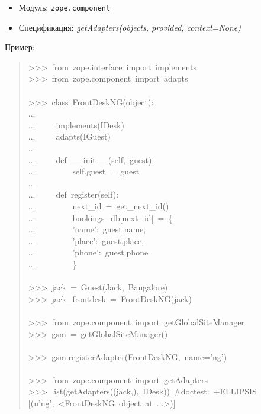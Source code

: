 \documentclass[14pt,a4paper,openany,twoside,final]{extbook}
\providecommand*{\DUroletitlereference}[1]{\textsl{#1}}
\begin{document}
\begin{itemize}

\item Модуль: \texttt{zope.component}

\item Спецификация: \DUroletitlereference{getAdapters(objects, provided, context=None)}

\end{itemize}

Пример:

\begin{quote}{\ttfamily \raggedright \noindent
>{}>{}>~from~zope.interface~import~implements\\
>{}>{}>~from~zope.component~import~adapts\\
~\\
>{}>{}>~class~FrontDeskNG(object):\\
...\\
...~~~~~implements(IDesk)\\
...~~~~~adapts(IGuest)\\
...\\
...~~~~~def~\_\_init\_\_(self,~guest):\\
...~~~~~~~~~self.guest~=~guest\\
...\\
...~~~~~def~register(self):\\
...~~~~~~~~~next\_id~=~get\_next\_id()\\
...~~~~~~~~~bookings\_db{[}next\_id{]}~=~\{\\
...~~~~~~~~~'name':~guest.name,\\
...~~~~~~~~~'place':~guest.place,\\
...~~~~~~~~~'phone':~guest.phone\\
...~~~~~~~~~\}\\
~\\
>{}>{}>~jack~=~Guest(\textquotedbl{}Jack\textquotedbl{},~\textquotedbl{}Bangalore\textquotedbl{})\\
>{}>{}>~jack\_frontdesk~=~FrontDeskNG(jack)\\
~\\
>{}>{}>~from~zope.component~import~getGlobalSiteManager\\
>{}>{}>~gsm~=~getGlobalSiteManager()\\
~\\
>{}>{}>~gsm.registerAdapter(FrontDeskNG,~name='ng')\\
~\\
>{}>{}>~from~zope.component~import~getAdapters\\
>{}>{}>~list(getAdapters((jack,),~IDesk))~\#doctest:~+ELLIPSIS\\
{[}(u'ng',~<FrontDeskNG~object~at~...>){]}
}
\end{quote}
\end{document}
